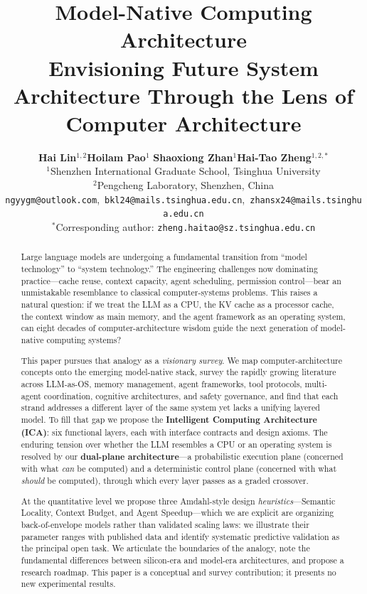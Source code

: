 \documentclass[11pt,a4paper]{article}
\title{\textbf{Model-Native Computing Architecture}\\[6pt]
\large Envisioning Future System Architecture Through the Lens of Computer Architecture}
\author{
\textbf{Hai Lin}$^{1,2}$\quad \textbf{Hoilam Pao}$^{1}$\quad
\textbf{Shaoxiong Zhan}$^{1}$\quad \textbf{Hai-Tao Zheng}$^{1,2,*}$\\[6pt]
$^{1}$Shenzhen International Graduate School, Tsinghua University\\
$^{2}$Pengcheng Laboratory, Shenzhen, China\\[4pt]
\texttt{ngyygm@outlook.com},\ \texttt{bkl24@mails.tsinghua.edu.cn},\ \texttt{zhansx24@mails.tsinghua.edu.cn}\\
$^{*}$Corresponding author: \texttt{zheng.haitao@sz.tsinghua.edu.cn}
}
\newcounter{axiom}[section]
\begin{document}
\maketitle

\begin{abstract}
Large language models are undergoing a fundamental transition from ``model technology'' to ``system technology.''
The engineering challenges now dominating practice---cache reuse, context capacity, agent scheduling, permission control---bear an unmistakable resemblance to classical computer-systems problems.
This raises a natural question: if we treat the LLM as a CPU, the KV cache as a processor cache, the context window as main memory, and the agent framework as an operating system, can eight decades of computer-architecture wisdom guide the next generation of model-native computing systems?

This paper pursues that analogy as a \emph{visionary survey}.
We map computer-architecture concepts onto the emerging model-native stack, survey the rapidly growing literature across LLM-as-OS, memory management, agent frameworks, tool protocols, multi-agent coordination, cognitive architectures, and safety governance, and find that each strand addresses a different layer of the same system yet lacks a unifying layered model.
To fill that gap we propose the \textbf{Intelligent Computing Architecture (ICA)}: six functional layers, each with interface contracts and design axioms.
The enduring tension over whether the LLM resembles a CPU or an operating system is resolved by our \textbf{dual-plane architecture}---a probabilistic execution plane (concerned with what \emph{can} be computed) and a deterministic control plane (concerned with what \emph{should} be computed), through which every layer passes as a graded crossover.

At the quantitative level we propose three Amdahl-style design \emph{heuristics}---Semantic Locality, Context Budget, and Agent Speedup---which we are explicit are organizing back-of-envelope models rather than validated scaling laws: we illustrate their parameter ranges with published data and identify systematic predictive validation as the principal open task.
We articulate the boundaries of the analogy, note the fundamental differences between silicon-era and model-era architectures, and propose a research roadmap.
This paper is a conceptual and survey contribution; it presents no new experimental results.
\end{abstract}
\end{document}
